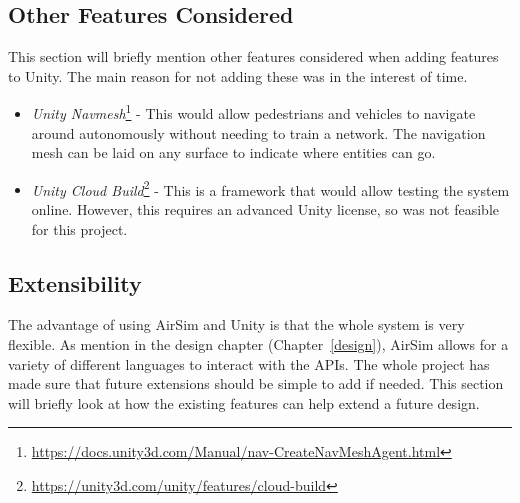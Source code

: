 \subsection{Other Features Considered}
This section will briefly mention other features considered when adding features to Unity. The main reason for not adding these was in the interest of time.
\begin{itemize}
\item \emph{Unity Navmesh}\footnote{\url{https://docs.unity3d.com/Manual/nav-CreateNavMeshAgent.html}} - This would allow pedestrians and vehicles to navigate around autonomously without needing to train a network. The navigation mesh can be laid on any surface to indicate where entities can go.
\item \emph{Unity Cloud Build}\footnote{\url{https://unity3d.com/unity/features/cloud-build}} - This is a framework that would allow testing the system online. However, this requires an advanced Unity license, so was not feasible for this project.
\end{itemize}


\subsection{Extensibility}
The advantage of using AirSim and Unity is that the whole system is very flexible. As mention in the design chapter (Chapter~\ref{design}), AirSim allows for a variety of different languages to interact with the APIs. The whole project has made sure that future extensions should be simple to add if needed. This section will briefly look at how the existing features can help extend a future design.


